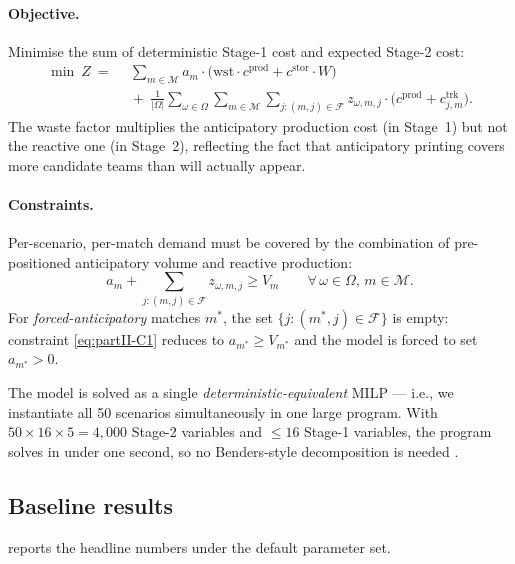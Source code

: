 \documentclass[11pt,a4paper]{article}
\numberwithin{equation}{section}
\begin{document}
\paragraph{Objective.} Minimise the sum of deterministic Stage-1 cost and expected Stage-2 cost:
\begin{align}
\min\ Z\ =\ &\ \sum_{m \in \mathcal{M}} a_m \cdot \big(\mathrm{wst} \cdot c^{\mathrm{prod}} + c^{\mathrm{stor}} \cdot W\big) \nonumber\\
&\ + \ \frac{1}{|\Omega|}\sum_{\omega \in \Omega} \sum_{m \in \mathcal{M}}\sum_{j:(m,j)\in\mathcal{F}} z_{\omega,m,j}\cdot\big(c^{\mathrm{prod}} + c^{\mathrm{trk}}_{j,m}\big). \label{eq:partII-obj}
\end{align}
The waste factor multiplies the anticipatory production cost (in Stage~1) but not the reactive one (in Stage~2), reflecting the fact that anticipatory printing covers more candidate teams than will actually appear.

\paragraph{Constraints.} Per-scenario, per-match demand must be covered by the combination of pre-positioned anticipatory volume and reactive production:
\begin{equation}
a_m + \sum_{j:(m,j)\in\mathcal{F}} z_{\omega,m,j} \ge V_m \qquad \forall\, \omega \in \Omega,\, m \in \mathcal{M}. \label{eq:partII-C1}
\end{equation}
For \emph{forced-anticipatory} matches $m^*$, the set $\{j : (m^*, j) \in \mathcal{F}\}$ is empty: constraint \eqref{eq:partII-C1} reduces to $a_{m^*} \ge V_{m^*}$ and the model is forced to set $a_{m^*} > 0$.

\begin{keybox}
The model is solved as a single \emph{deterministic-equivalent} MILP — i.e., we instantiate all 50 scenarios simultaneously in one large program. With $50 \times 16 \times 5 = 4{,}000$ Stage-2 variables and $\le 16$ Stage-1 variables, the program solves in under one second, so no Benders-style decomposition is needed \cite{birge_louveaux}.
\end{keybox}

\subsection{Baseline results}\label{sec:partII:baseline}

 reports the headline numbers under the default parameter set.
\end{document}
